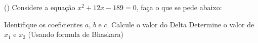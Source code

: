 \begin{question} () %
Considere a equação $x^2+12x-189=0$, faça o que se pede abaixo:
\begin{tasks}
        \task Identifique os coeficientes $a$, $b$ e $c$.
        \task Calcule o valor do Delta
        \task Determine o valor de $x_{1}$ e $x_{2}$ (Usando formula de Bhaskara)
    \end{tasks}
\end{question}